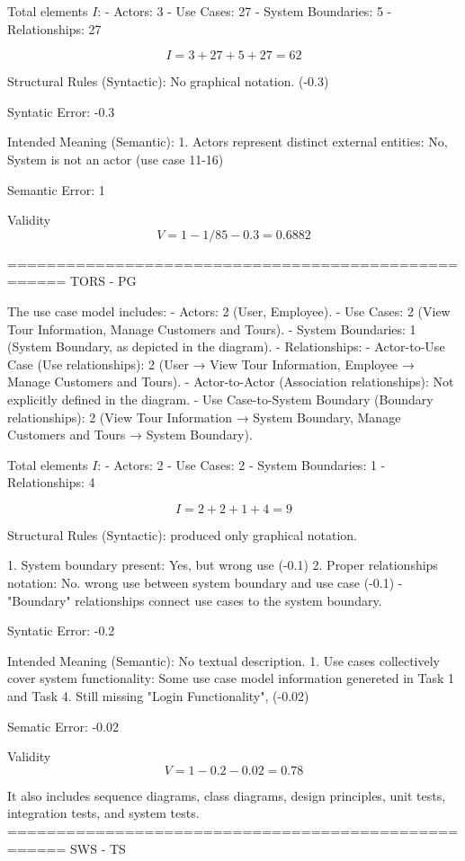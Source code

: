 Total elements \( I \):
- Actors: 3
- Use Cases: 27
- System Boundaries: 5
- Relationships: 27

\[
I = 3 + 27 + 5 + 27 = 62
\]

Structural Rules (Syntactic): No graphical notation. (-0.3)

Syntatic Error: -0.3

Intended Meaning (Semantic):
1. Actors represent distinct external entities: No, System is not an actor (use case 11-16)

Semantic Error: 1

Validity
\[
V = 1 - 1/85-0.3 = 0.6882
\]

====================================================
TORS - PG

The use case model includes:
- Actors: 2 (User, Employee).
- Use Cases: 2 (View Tour Information, Manage Customers and Tours).
- System Boundaries: 1 (System Boundary, as depicted in the diagram).
- Relationships:
- Actor-to-Use Case (Use relationships): 2 (User → View Tour Information, Employee → Manage Customers and Tours).
- Actor-to-Actor (Association relationships): Not explicitly defined in the diagram.
- Use Case-to-System Boundary (Boundary relationships): 2 (View Tour Information → System Boundary, Manage Customers and Tours → System Boundary).

Total elements \( I \):
- Actors: 2
- Use Cases: 2
- System Boundaries: 1
- Relationships:  4

\[
I = 2 + 2 + 1 + 4 = 9
\]

Structural Rules (Syntactic): produced only graphical notation. 

1. System boundary present: Yes, but wrong use (-0.1) 
2. Proper relationships notation: No. wrong use between system boundary and use case (-0.1)
- "Boundary" relationships connect use cases to the system boundary.

Syntatic Error: -0.2

Intended Meaning (Semantic): No textual description. 
1. Use cases collectively cover system functionality: Some use case model information genereted in Task 1 and Task 4. Still missing "Login Functionality", (-0.02)

Sematic Error: -0.02

Validity
\[
V = 1 - 0.2 - 0.02 = 0.78
\]

It also includes sequence diagrams, class diagrams, design principles, unit tests, integration tests, and system tests. 
====================================================
SWS - TS

